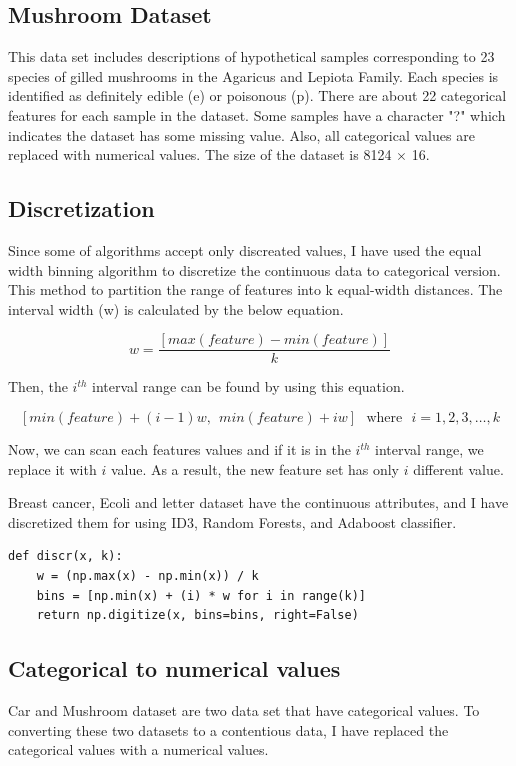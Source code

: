 \subsection{Mushroom Dataset}

This data set includes descriptions of hypothetical samples corresponding to 23 species of gilled mushrooms in the Agaricus and Lepiota Family. Each species is identified as definitely edible (e) or poisonous (p). There are about 22 categorical features for each sample in the dataset. Some samples have a character "?" which indicates the dataset has some missing value. Also, all categorical values are replaced with numerical values. The size of the dataset is 8124 $\times$ 16.


\subsection{Discretization}
Since some of algorithms accept only discreated values, I have used the equal width binning algorithm to discretize the continuous data to categorical version. This method to partition the range of features into k equal-width distances. The interval width (w) is calculated by the below equation.

$$
w = \frac{[ max(feature)-min(feature)] }{k}
$$

Then, the $i^{th}$ interval range can be found by using this equation.

$$
[min(feature) + (i-1)w,~~ min(feature) + iw] \mbox{~~where~~}  i = 1, 2, 3, \dots, k
$$

Now, we can scan each features values and if it is in the $i^{th}$ interval range, we replace it with $i$ value. As a result, the new feature set has only $i$ different value.

Breast cancer, Ecoli and letter dataset have the continuous attributes, and I have discretized them for using ID3, Random Forests, and Adaboost classifier. 

\begin{table}[H]
\centering
\caption{The equal width binning function for discretizing the continious data to categorical version.}
\begin{lstlisting}
def discr(x, k):
    w = (np.max(x) - np.min(x)) / k
    bins = [np.min(x) + (i) * w for i in range(k)]
    return np.digitize(x, bins=bins, right=False)
\end{lstlisting}
\end{table}





\subsection{Categorical to numerical values}
Car and Mushroom dataset are two data set that have categorical values. To converting these two datasets to a contentious data, I have replaced the categorical values with a numerical values. 

